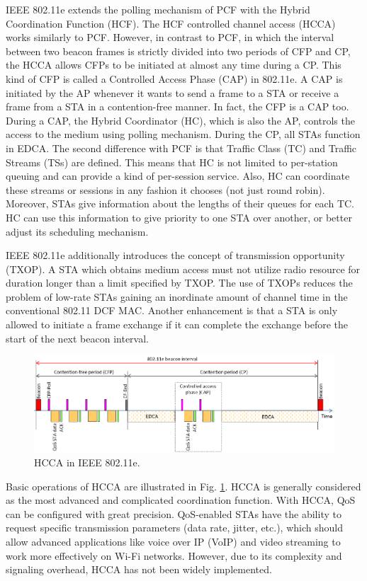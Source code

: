 \documentclass[12pt,onecolumn]{article}
\begin{document}
IEEE 802.11e extends the polling mechanism of PCF with the Hybrid Coordination Function (HCF). The HCF controlled channel access (HCCA) works similarly to PCF. However, in contrast to PCF, in which the interval between two beacon frames is strictly divided into two periods of CFP and CP, the HCCA allows CFPs to be initiated at almost any time during a CP. This kind of CFP is called a Controlled Access Phase (CAP) in 802.11e. A CAP is initiated by the AP whenever it wants to send a frame to a STA or receive a frame from a STA in a contention-free manner. In fact, the CFP is a CAP too. During a CAP, the Hybrid Coordinator (HC), which is also the AP, controls the access to the medium using polling mechanism. During the CP, all STAs function in EDCA. The second difference with PCF is that Traffic Class (TC) and Traffic Streams (TSs) are defined. This means that HC is not limited to per-station queuing and can provide a kind of per-session service. Also, HC can coordinate these streams or sessions in any fashion it chooses (not just round robin). Moreover, STAs give information about the lengths of their queues for each TC. HC can use this information to give priority to one STA over another, or better adjust its scheduling mechanism.

IEEE 802.11e additionally introduces the concept of transmission opportunity (TXOP). A STA which obtains medium access must not utilize radio resource for duration longer than a limit specified by TXOP. The use of TXOPs reduces the problem of low-rate STAs gaining an inordinate amount of channel time in the conventional 802.11 DCF MAC. Another enhancement is that a STA is only allowed to initiate a frame exchange if it can complete the exchange before the start of the next beacon interval.

\begin{figure}[!t]
\centering
\includegraphics[width=1.0\columnwidth]{figures2/802-11e-HCCA}
\caption{HCCA in IEEE 802.11e.}
\label{figs:802-11e-HCCA}
\end{figure}

Basic operations of HCCA are illustrated in Fig. \ref{figs:802-11e-HCCA}. HCCA is generally considered as the most advanced and complicated coordination function. With HCCA, QoS can be configured with great precision. QoS-enabled STAs have the ability to request specific transmission parameters (data rate, jitter, etc.), which should allow advanced applications like voice over IP (VoIP) and video streaming to work more effectively on Wi-Fi networks. However, due to its complexity and signaling overhead, HCCA has not been widely implemented.
\end{document}
